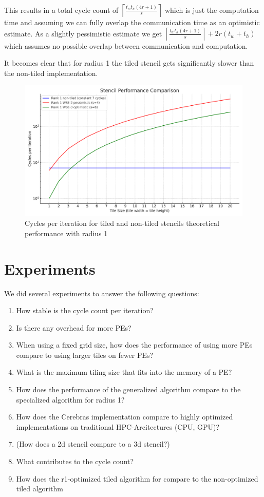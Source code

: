 \documentclass{article}
\begin{document}
This results in a total cycle count of $\left\lceil\frac{t_wt_h(4r+1)}{s}\right\rceil$ which is just the computation time and assuming we can fully overlap the communication time as an optimistic estimate. As a slightly pessimistic estimate we get $\left\lceil\frac{t_wt_h(4r+1)}{s}\right\rceil+2r(t_w+t_h)$ which assumes no possible overlap between communication and computation. 

It becomes clear that for radius 1 the tiled stencil gets significantly slower than the non-tiled implementation. 
\begin{figure}
    \centering
    \includegraphics[width=0.5\linewidth]{plots/stencil_performance_comparison.png}
    \caption{Cycles per iteration for tiled and non-tiled stencils theoretical performance with radius 1 }
    \label{fig:enter-label}
\end{figure}



\section{Experiments}
We did several experiments to answer the following questions:
\begin{enumerate}
    \item How stable is the cycle count per iteration?
    \item Is there any overhead for more PEs?
    \item When using a fixed grid size, how does the performance of using more PEs compare to using larger tiles on fewer PEs?
    \item What is the maximum tiling size that fits into the memory of a PE?
    \item How does the performance of the generalized algorithm compare to the specialized algorithm for radius 1?
    \item How does the Cerebras implementation compare to highly optimized implementations on traditional HPC-Arcitectures (CPU, GPU)?
    \item (How does a 2d stencil compare to a 3d stencil?)
    \item What contributes to the cycle count?
    \item How does the r1-optimized tiled algorithm for compare to the non-optimized tiled algorithm
\end{enumerate}
\end{document}
